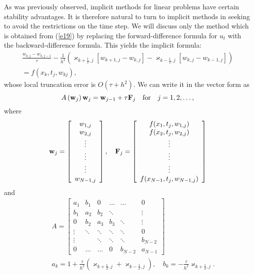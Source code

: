 As was previously observed, implicit
methods for linear problems have certain stability advantages. It is therefore
natural to turn to implicit methods in seeking to avoid the restrictions
on the time step. We will discuss only the method which is obtained from
(\ref{e19}) by replacing the forward-difference formula for $u_t$
with the backward-difference formula. This yields the implicit formula:
\begin{multline}
\frac{w_{k,j}-w_{k,j-1}}{\tau}-
\frac{1}{h^2}
\left(\varkappa_{k+\frac{1}{2},j}\left[w_{k+1,j}-w_{k,j}\right]-
\varkappa_{k-\frac{1}{2},j}\left[w_{k,j}-w_{k-1,j}\right]\right)
\\=f(x_{k},t_{j},w_{kj}),\label{e20}
\end{multline}
whose local truncation error is $O(\tau+h^2)$.
We can write it in the vector form as
\begin{equation}
A\left({\bf w}_{j}\right){\bf w}_{j}={\bf w}_{j-1}+\tau {\bf F}_{j} \quad \hbox{for} \quad j=1,2,\dots, \label{e21}
\end{equation}
where
\[
{\bf w}_{j}=\left[
\begin{array}{c}
w_{1,j} \\
w_{2,j} \\
\vdots \\
\vdots \\
\vdots \\
w_{N-1,j}
\end{array}\right], \quad
{\bf F}_{j}=
\left[
\begin{array}{c}
f(x_{1},t_{j},w_{1,j}) \\
f(x_{2},t_{j},w_{2,j}) \\
\vdots \\
\vdots \\
\vdots \\
f(x_{N-1},t_{j},w_{N-1,j})
\end{array}\right]
\]
and
\begin{eqnarray}
&&A=\left[
\begin{array}{cccccc}
a_{1} & b_{1} &0      &\dots  &\dots &0 \\
b_{1} &a_{2} &b_{2} &\ddots  &     &\vdots \\
0      &b_{2} &a_{3} &b_{3} &\ddots &\vdots \\
\vdots &\ddots &\ddots &\ddots &\ddots &0 \\
\vdots &       &\ddots &\ddots &\ddots &b_{N-2} \\
0      &\dots  &\dots  &0      &b_{N-2} &a_{N-1}
\end{array}\right] \nonumber \\
&&a_{k}=1+\frac{\tau}{h^2}(\varkappa_{k+\frac{1}{2},j}+\varkappa_{k-\frac{1}{2},j}), \quad
b_{k}=-\frac{\tau}{h^2}\varkappa_{k+\frac{1}{2},j}.
\nonumber
\end{eqnarray}
